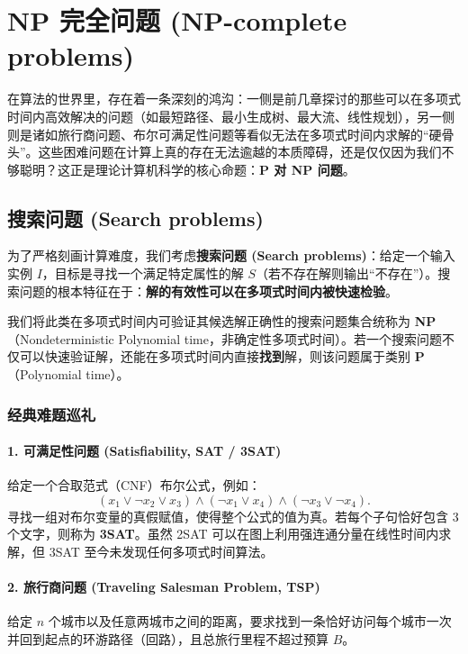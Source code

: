 \chapter{NP 完全问题 (NP-complete problems)}

在算法的世界里，存在着一条深刻的鸿沟：一侧是前几章探讨的那些可以在多项式时间内高效解决的问题（如最短路径、最小生成树、最大流、线性规划），另一侧则是诸如旅行商问题、布尔可满足性问题等看似无法在多项式时间内求解的“硬骨头”。这些困难问题在计算上真的存在无法逾越的本质障碍，还是仅仅因为我们不够聪明？这正是理论计算机科学的核心命题：\textbf{P 对 NP 问题}。

\section{搜索问题 (Search problems)}

为了严格刻画计算难度，我们考虑\textbf{搜索问题 (Search problems)}：给定一个输入实例 $I$，目标是寻找一个满足特定属性的解 $S$（若不存在解则输出“不存在”）。搜索问题的根本特征在于：\textbf{解的有效性可以在多项式时间内被快速检验}。

我们将此类在多项式时间内可验证其候选解正确性的搜索问题集合统称为 \textbf{NP}（Nondeterministic Polynomial time，非确定性多项式时间）。若一个搜索问题不仅可以快速验证解，还能在多项式时间内直接\textbf{找到}解，则该问题属于类别 \textbf{P}（Polynomial time）。

\subsection{经典难题巡礼}

\subsubsection*{1. 可满足性问题 (Satisfiability, SAT / 3SAT)}
给定一个合取范式（CNF）布尔公式，例如：
\[
(x_1 \lor \neg x_2 \lor x_3) \land (\neg x_1 \lor x_4) \land (\neg x_3 \lor \neg x_4).
\]
寻找一组对布尔变量的真假赋值，使得整个公式的值为真。若每个子句恰好包含 3 个文字，则称为 \textbf{3SAT}。虽然 2SAT 可以在图上利用强连通分量在线性时间内求解，但 3SAT 至今未发现任何多项式时间算法。

\subsubsection*{2. 旅行商问题 (Traveling Salesman Problem, TSP)}
给定 $n$ 个城市以及任意两城市之间的距离，要求找到一条恰好访问每个城市一次并回到起点的环游路径（回路），且总旅行里程不超过预算 $B$。

